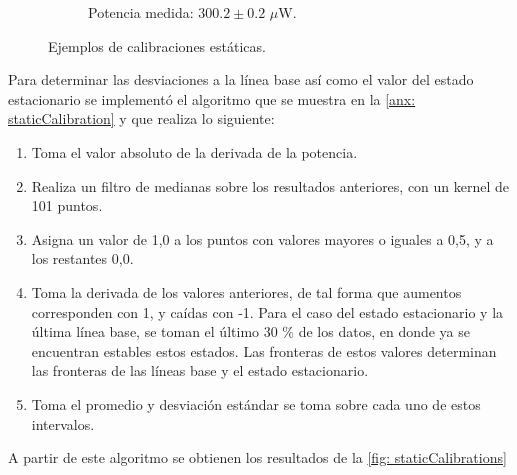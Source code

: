 \begin{figure}[h]
\begin{subfigure}{0.45\linewidth}
			\caption{Potencia medida: $300.2 \pm 0.2$ $\mu$W.}
			\label{fig: noZeroCal}
		\end{subfigure}
		\caption{Ejemplos de calibraciones estáticas.}
		\label{fig: staticCalibrations}
	\end{figure}

	\newpage
	Para determinar las desviaciones a la línea base así como el valor del estado estacionario se implementó el algoritmo que se muestra en la \autoref{anx: staticCalibration} y que realiza lo siguiente:
	\begin{enumerate}
		\item Toma el valor absoluto de la derivada de la potencia.
		\item Realiza un filtro de medianas sobre los resultados anteriores, con un kernel de 101 puntos.
		\item Asigna un valor de 1,0 a los puntos con valores mayores o iguales a 0,5, y a los restantes 0,0.
		\item Toma la derivada de los valores anteriores, de tal forma que aumentos corresponden con 1, y caídas con -1. Para el caso del estado estacionario y la última línea base, se toman el último 30 \% de los datos, en donde ya se encuentran estables estos estados. Las fronteras de estos valores determinan las fronteras de las líneas base y el estado estacionario.
		\item Toma el promedio y desviación estándar se toma sobre cada uno de estos intervalos.
	\end{enumerate}

	A partir de este algoritmo se obtienen los resultados de la \autoref{fig: staticCalibrations}
	
	\newpage
